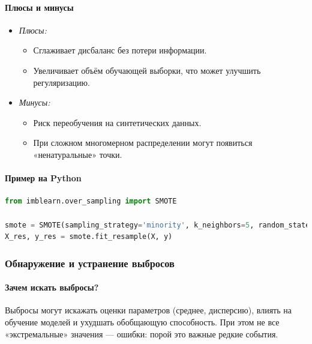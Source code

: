 \paragraph{Плюсы и минусы}
\begin{itemize}
  \item \emph{Плюсы:}  
    \begin{itemize}
      \item Сглаживает дисбаланс без потери информации.  
      \item Увеличивает объём обучающей выборки, что может улучшить регуляризацию.
    \end{itemize}
  \item \emph{Минусы:}  
    \begin{itemize}
      \item Риск переобучения на синтетических данных.  
      \item При сложном многомерном распределении могут появиться «ненатуральные» точки.
    \end{itemize}
\end{itemize}

\paragraph{Пример на Python}
\begin{lstlisting}[language=Python]
from imblearn.over_sampling import SMOTE

smote = SMOTE(sampling_strategy='minority', k_neighbors=5, random_state=42)
X_res, y_res = smote.fit_resample(X, y)
\end{lstlisting}

\subsubsection{Обнаружение и устранение выбросов}
\label{sec:outliers}

\paragraph{Зачем искать выбросы?}  
Выбросы могут искажать оценки параметров (среднее, дисперсию), влиять на обучение моделей и ухудшать обобщающую способность. При этом не все «экстремальные» значения — ошибки: порой это важные редкие события.

